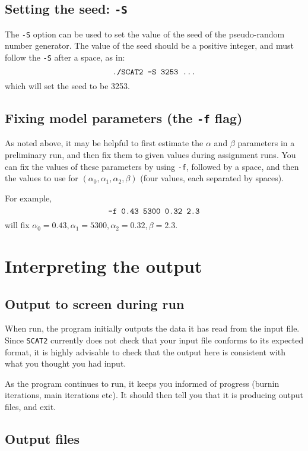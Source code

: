 \documentclass[11pt,titlepage,times,letterpaper]{article}
\def\SCAT{{\tt SCAT2} }
\begin{document}
\subsection{Setting the seed: {\tt -S}} \label{Soption}

The {\tt -S} option can be used to set the value of the seed of the
pseudo-random number generator. The value of the seed should be a
positive integer, and must follow the {\tt -S} after a space, as in:
$$\text{{\tt ./SCAT2 -S 3253 ...}}$$
which will set the seed to be 3253.

\subsection{Fixing model parameters (the {\tt -f} flag)}

As noted above, it may be helpful to first estimate the $\alpha$ and
$\beta$ parameters in a preliminary run, and then fix them to given
values during assignment runs. You can fix the values of these
parameters by using {\tt -f}, followed by a space, and then the values
to use for $(\alpha_0,\alpha_1,\alpha_2,\beta)$ (four values, each
separated by spaces).

For example,
$$\text{\tt -f 0.43 5300 0.32 2.3}$$ will fix $\alpha_0 = 0.43, \alpha_1 =
5300, \alpha_2 = 0.32, \beta = 2.3$.





\section{Interpreting the output} \label{interpret}

\subsection{Output to screen during run}

When run, the program initially outputs the data it has read from the
input file. Since \SCAT currently does not check that your input file
conforms to its expected format, it is highly advisable to check that
the output here is consistent with what you thought you had input.

As the program continues to run, it keeps you informed of progress
(burnin iterations, main iterations etc). It should then tell you
that it is producing output files, and exit.

\subsection{Output files} \label{out}
\end{document}
